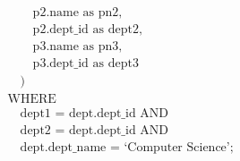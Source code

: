 \begin{example}
\begin{equation*}
\begin{split}
            &   \hspace{2em} \text{p2.name as pn2,} \\
            &   \hspace{2em} \text{p2.dept\_id as dept2,} \\
            &   \hspace{2em} \text{p3.name as pn3,} \\
            &   \hspace{2em} \text{p3.dept\_id as dept3} \\
            & \hspace{1em} \text{)} \\
            & \text{WHERE} \\ 
            &   \hspace{1em} \text{dept1 = dept.dept\_id AND} \\
            & \hspace{1em} \text{dept2 = dept.dept\_id AND} \\
            & \hspace{1em} \text{dept.dept\_name = `Computer Science';} \\
        \end{split}
    \end{equation*}


\end{example}
